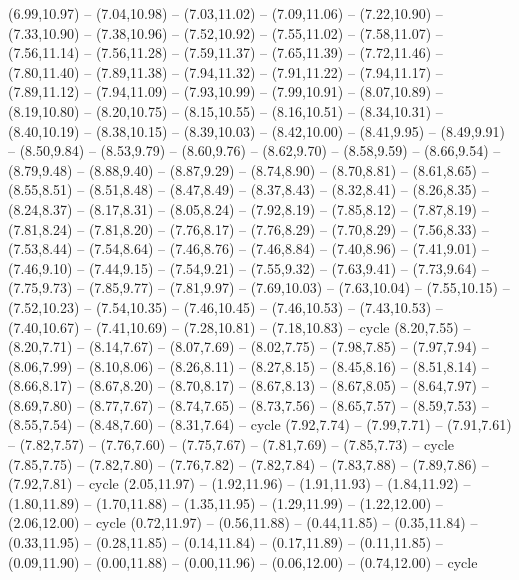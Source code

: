 \expandafter\def\csname geo:gebiet:FIN\endcsname{
  (6.99,10.97) -- (7.04,10.98) -- (7.03,11.02) -- (7.09,11.06) -- (7.22,10.90) -- (7.33,10.90) -- (7.38,10.96) -- (7.52,10.92) -- (7.55,11.02) -- (7.58,11.07) -- (7.56,11.14) -- (7.56,11.28) -- (7.59,11.37) -- (7.65,11.39) -- (7.72,11.46) -- (7.80,11.40) -- (7.89,11.38) -- (7.94,11.32) -- (7.91,11.22) -- (7.94,11.17) -- (7.89,11.12) -- (7.94,11.09) -- (7.93,10.99) -- (7.99,10.91) -- (8.07,10.89) -- (8.19,10.80) -- (8.20,10.75) -- (8.15,10.55) -- (8.16,10.51) -- (8.34,10.31) -- (8.40,10.19) -- (8.38,10.15) -- (8.39,10.03) -- (8.42,10.00) -- (8.41,9.95) -- (8.49,9.91) -- (8.50,9.84) -- (8.53,9.79) -- (8.60,9.76) -- (8.62,9.70) -- (8.58,9.59) -- (8.66,9.54) -- (8.79,9.48) -- (8.88,9.40) -- (8.87,9.29) -- (8.74,8.90) -- (8.70,8.81) -- (8.61,8.65) -- (8.55,8.51) -- (8.51,8.48) -- (8.47,8.49) -- (8.37,8.43) -- (8.32,8.41) -- (8.26,8.35) -- (8.24,8.37) -- (8.17,8.31) -- (8.05,8.24) -- (7.92,8.19) -- (7.85,8.12) -- (7.87,8.19) -- (7.81,8.24) -- (7.81,8.20) -- (7.76,8.17) -- (7.76,8.29) -- (7.70,8.29) -- (7.56,8.33) -- (7.53,8.44) -- (7.54,8.64) -- (7.46,8.76) -- (7.46,8.84) -- (7.40,8.96) -- (7.41,9.01) -- (7.46,9.10) -- (7.44,9.15) -- (7.54,9.21) -- (7.55,9.32) -- (7.63,9.41) -- (7.73,9.64) -- (7.75,9.73) -- (7.85,9.77) -- (7.81,9.97) -- (7.69,10.03) -- (7.63,10.04) -- (7.55,10.15) -- (7.52,10.23) -- (7.54,10.35) -- (7.46,10.45) -- (7.46,10.53) -- (7.43,10.53) -- (7.40,10.67) -- (7.41,10.69) -- (7.28,10.81) -- (7.18,10.83) -- cycle}
\expandafter\def\csname geo:gebiet:EST\endcsname{
  (8.20,7.55) -- (8.20,7.71) -- (8.14,7.67) -- (8.07,7.69) -- (8.02,7.75) -- (7.98,7.85) -- (7.97,7.94) -- (8.06,7.99) -- (8.10,8.06) -- (8.26,8.11) -- (8.27,8.15) -- (8.45,8.16) -- (8.51,8.14) -- (8.66,8.17) -- (8.67,8.20) -- (8.70,8.17) -- (8.67,8.13) -- (8.67,8.05) -- (8.64,7.97) -- (8.69,7.80) -- (8.77,7.67) -- (8.74,7.65) -- (8.73,7.56) -- (8.65,7.57) -- (8.59,7.53) -- (8.55,7.54) -- (8.48,7.60) -- (8.31,7.64) -- cycle
  (7.92,7.74) -- (7.99,7.71) -- (7.91,7.61) -- (7.82,7.57) -- (7.76,7.60) -- (7.75,7.67) -- (7.81,7.69) -- (7.85,7.73) -- cycle
  (7.85,7.75) -- (7.82,7.80) -- (7.76,7.82) -- (7.82,7.84) -- (7.83,7.88) -- (7.89,7.86) -- (7.92,7.81) -- cycle}
\expandafter\def\csname geo:gebiet:GRL\endcsname{
  (2.05,11.97) -- (1.92,11.96) -- (1.91,11.93) -- (1.84,11.92) -- (1.80,11.89) -- (1.70,11.88) -- (1.35,11.95) -- (1.29,11.99) -- (1.22,12.00) -- (2.06,12.00) -- cycle
  (0.72,11.97) -- (0.56,11.88) -- (0.44,11.85) -- (0.35,11.84) -- (0.33,11.95) -- (0.28,11.85) -- (0.14,11.84) -- (0.17,11.89) -- (0.11,11.85) -- (0.09,11.90) -- (0.00,11.88) -- (0.00,11.96) -- (0.06,12.00) -- (0.74,12.00) -- cycle}

